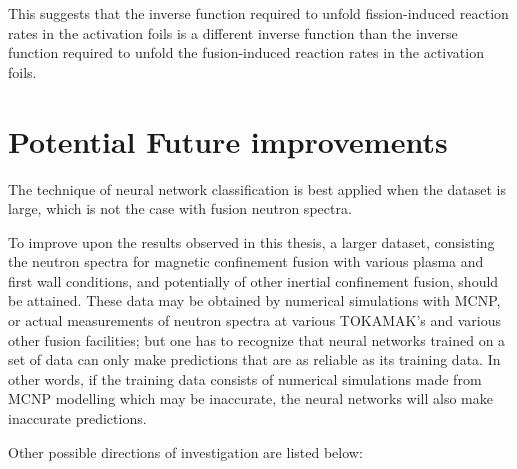 \documentclass[a4paper, 12pt]{article}
\begin{document}
    This suggests that the inverse function required to unfold fission-induced reaction rates in the activation foils is a different inverse function than the inverse function required to unfold the fusion-induced reaction rates in the activation foils.%

\section{Potential Future improvements}
    The technique of neural network classification is best applied when the dataset is large, which is not the case with fusion neutron spectra.

    To improve upon the results observed in this thesis, a larger dataset, consisting the neutron spectra for magnetic confinement fusion with various plasma and first wall conditions, and potentially of other inertial confinement fusion, should be attained. These data may be obtained by numerical simulations with MCNP, or actual measurements of neutron spectra at various TOKAMAK's and various other fusion facilities; but one has to recognize that neural networks trained on a set of data can only make predictions that are as reliable as its training data. In other words, if the training data consists of numerical simulations made from MCNP modelling which may be inaccurate, the neural networks will also make inaccurate predictions.

    Other possible directions of investigation are listed below:
\end{document}
